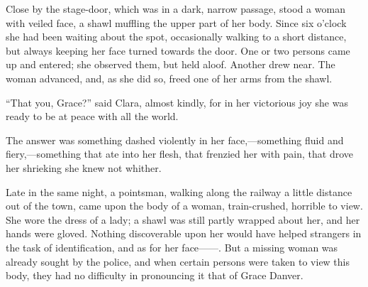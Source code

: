 Close by the stage-door, which was in a dark, narrow passage, stood a
woman with veiled face, a shawl muffling the upper part of her body.
Since six o'clock she had been waiting about the spot, occasionally
walking to a short distance, but always keeping her face turned towards
the door. One or two persons came up and entered; she observed them, but
held aloof. Another drew near. The woman advanced, and, as she did so,
freed one of her arms from the shawl.

{}``That you, Grace?'' said Clara, almost kindly, for in her victorious
joy she was ready to be at peace with all the world.

The answer was something dashed violently in her face,---something fluid
and fiery,---something that ate into her flesh, that frenzied her with
pain, that drove her shrieking she knew not whither.

Late in the same night, a pointsman, walking along the railway a little
distance out of the town, came upon the body of a woman, train-crushed,
horrible to view. She wore the dress of a lady; a shawl was still partly
wrapped about her, and her hands were gloved. Nothing discoverable upon
her would have helped strangers in the task of identification, and as
for her {face{{------}}.} But a missing woman was already sought by the
police, and when certain persons were taken to view this body, they had
no difficulty in pronouncing it that of Grace Danver.
